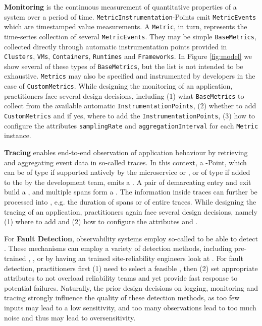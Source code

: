 \textbf{Monitoring} is the continuous measurement of quantitative properties of a system over a period of time. \texttt{MetricInstrumentation}-Points emit \texttt{MetricEvents} which are timestamped value measurements. A \texttt{Metric}, in turn, represents the time-series collection of several \texttt{MetricEvents}. They may be simple \texttt{BaseMetrics}, collected directly through automatic instrumentation points provided in \texttt{Clusters}, \texttt{VMs}, \texttt{Containers}, \texttt{Runtimes} and \texttt{Frameworks}. In Figure \ref{fig:model} we show several of these types of \texttt{BaseMetrics}, but the list is not intended to be exhaustive. \texttt{Metrics} may also be specified and instrumented by developers in the case of \texttt{CustomMetrics}. While designing the monitoring of an application, practitioners face several design decisions, including (1) what \texttt{BaseMetrics} to collect from the available automatic \texttt{InstrumentationPoints}, (2) whether to add \texttt{CustomMetrics} and if yes, where to add the \texttt{InstrumentationPoints}, (3) how to configure the attributes \texttt{samplingRate} and \texttt{aggregationInterval} for each \texttt{Metric} instance.


\textbf{Tracing} enables end-to-end observation of appli\-cation behaviour by retrieving
and aggregating event data in so-called traces. In this context, a -Point, which can be of type  if supported natively by the microservice  or , or of type  if added to the  by the development team, emits a . A pair of  demarcating entry and exit build a , and multiple spans form a . The information inside traces can further be processed into , e.g. the duration of spans or of entire traces. While designing the tracing of an application, practitioners again face several design decisions, namely (1) where to add  and (2) how to configure the attributes  and .

For \textbf{Fault Detection}, observability systems employ so-called  to be able to detect . These mechanisms can employ a variety of detection methods, including pre-trained , ,  or by having an trained site-reliability engineers look at . For fault detection, practitioners first (1) need to select a feasible , then (2) set appropriate attributes to not overload reliability teams and yet provide fast response to potential failures. Naturally, the prior design decisions on logging, monitoring and tracing strongly influence the quality of these detection methods, as too few inputs may lead to a low sensitivity, and too many observations lead to too much noise and thus may lead to oversensitivity.
